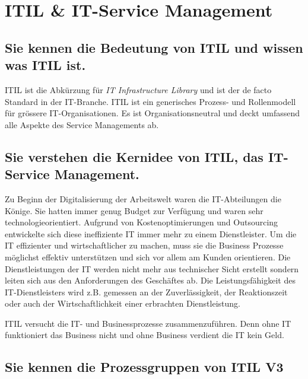 \chapter{ITIL \& IT-Service Management}

\section{Sie kennen die Bedeutung von ITIL und wissen was ITIL ist.}

ITIL ist die Abkürzung für \emph{IT Infrastructure Library} und ist der de facto Standard in der IT-Branche. ITIL ist ein generisches Prozess- und Rollenmodell für grössere IT-Organisationen. Es ist Organisationsneutral und deckt umfassend alle Aspekte des Service Managements ab. 

\section{Sie verstehen die Kernidee von ITIL, das IT-Service Management.}

Zu Beginn der Digitalisierung der Arbeitswelt waren die IT-Abteilungen die Könige. Sie hatten immer genug Budget zur Verfügung und waren sehr technologieorientiert. Aufgrund von Kostenoptimierungen und Outsourcing entwickelte sich diese ineffiziente IT immer mehr zu einem Dienstleister. Um die IT effizienter und wirtschaftlicher zu machen, muss sie die Business Prozesse möglichst effektiv unterstützen und sich vor allem am Kunden orientieren. Die Dienstleistungen der IT werden nicht mehr aus technischer Sicht erstellt sondern leiten sich aus den Anforderungen des Geschäftes ab. Die Leistungsfähigkeit des IT-Dienstleisters wird z.B. gemessen an der Zuverlässigkeit, der Reaktionszeit oder auch der Wirtschaftlichkeit einer erbrachten Dienstleistung.

ITIL versucht die IT- und Businessprozesse zusammenzuführen. Denn ohne IT funktioniert das Business nicht und ohne Business verdient die IT kein Geld.

\section{Sie kennen die Prozessgruppen von ITIL V3}

